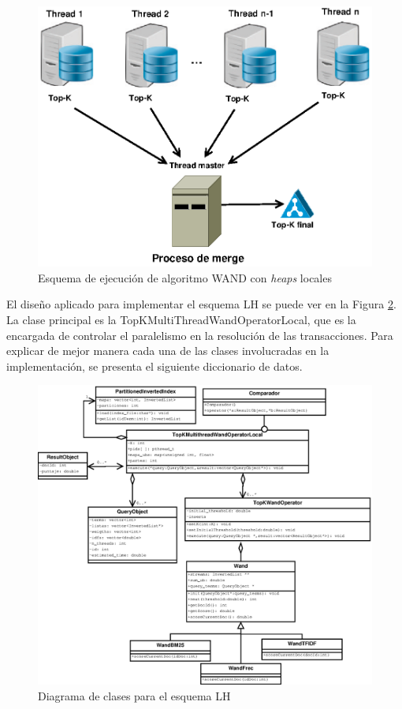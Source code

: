 \begin{figure}[!ht]
\centering
\includegraphics[scale=.75]{images/wand_heaps_locales.eps}
\caption{Esquema de ejecución de algoritmo WAND con \textit{heaps} locales}
\label{fig:wand-heap-local}
\end{figure}

El diseño aplicado para implementar el esquema LH se puede ver en la Figura \ref{fig:TopKMultiThreadWandOperatorLocal}. La clase principal es la TopKMultiThreadWandOperatorLocal, que es la encargada de controlar el paralelismo en la resolución de las transacciones. Para explicar de mejor manera cada una de las clases involucradas en la implementación, se presenta el siguiente diccionario de datos.

\begin{figure}[!ht]
\centering
\includegraphics[scale=.75]{images/TopKMultiThreadWandOperatorLocal.eps}
\caption{Diagrama de clases para el esquema LH}
\label{fig:TopKMultiThreadWandOperatorLocal}
\end{figure}

